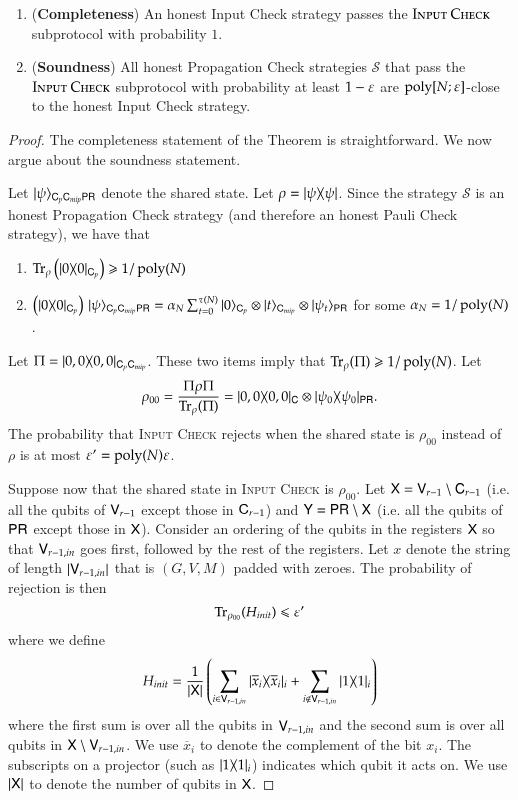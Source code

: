 \begin{lemma}	
\label{lem:input_check}
\leavevmode
\begin{enumerate}
	\item (\textbf{Completeness}) An honest Input Check strategy passes the $\textsc{Input Check}$ subprotocol with probability $1$. 
	\item (\textbf{Soundness}) All honest Propagation Check strategies $\mathcal{S}$ that pass the $\textsc{Input Check}$ subprotocol with probability at least $1 - \varepsilon$ are $\operatorname{poly}[N;\varepsilon]$-close to the honest Input Check strategy.
\end{enumerate}
\end{lemma}
\begin{proof}
The completeness statement of the Theorem is straightforward. We now argue about the soundness statement.

Let $|\psi\rangle_{{\mathsf{C}}_p {\mathsf{C}}_{mip} {\mathsf{P}} {\mathsf{R}}}$ denote the shared state. Let $\rho = |\psi\rangle\! \langle \psi|$. Since the strategy $\mathcal{S}$ is an honest Propagation Check strategy (and therefore an honest Pauli Check strategy), we have that
\begin{enumerate}
	\item $\operatorname{Tr}_\rho \left ( |0\rangle\! \langle 0|_{{\mathsf{C}}_p} \right) \geqslant 1/\operatorname{poly}(N)$
	\item $	\left( |0\rangle\! \langle 0|_{{\mathsf{C}}_p} \right) \, |\psi\rangle_{{\mathsf{C}}_p {\mathsf{C}}_{mip} {\mathsf{P}} {\mathsf{R}}} = \alpha_N \sum_{t = 0}^{\tau(N)} |0\rangle_{{\mathsf{C}}_p} \otimes |t\rangle_{{\mathsf{C}}_{mip}} \otimes |\psi_t\rangle_{{\mathsf{P}} {\mathsf{R}}}$ for some $\alpha_N = 1/\operatorname{poly}(N)$.
\end{enumerate}
Let $\Pi = |0,0\rangle\! \langle 0,0|_{{\mathsf{C}}_p {\mathsf{C}}_{mip}}$. These two items imply that $\operatorname{Tr}_\rho (\Pi) \geqslant 1/\operatorname{poly}(N)$. Let 
\[
	\rho_{00} = \frac{\Pi \rho \Pi}{\operatorname{Tr}_\rho (\Pi)} = |0,0\rangle\! \langle 0,0|_{{\mathsf{C}}} \otimes |\psi_0\rangle\! \langle \psi_0|_{{\mathsf{P}} {\mathsf{R}}}.
\]
The probability that \textsc{Input Check} rejects when the shared state is $\rho_{00}$ instead of $\rho$ is at most $\varepsilon' = \operatorname{poly}(N) \varepsilon$. 

Suppose now that the shared state in \textsc{Input Check} is $\rho_{00}$. Let ${\mathsf{X}} = {\mathsf{V}}_{r-1} \setminus {\mathsf{C}}_{r-1}$ (i.e. all the qubits of ${\mathsf{V}}_{r-1}$ except those in ${\mathsf{C}}_{r-1}$) and ${\mathsf{Y}} = {\mathsf{P}} {\mathsf{R}} \setminus {\mathsf{X}}$ (i.e. all the qubits of ${\mathsf{P}} {\mathsf{R}}$ except those in ${\mathsf{X}}$). Consider an ordering of the qubits in the registers ${\mathsf{X}}$  so that ${\mathsf{V}}_{r-1,in}$ goes first, followed by the rest of the registers. Let $x$ denote the string of length $|{\mathsf{V}}_{r-1,in}|$ that is $(G,V,M)$ padded with zeroes. The probability of rejection is then
	\begin{equation}
		\Tr_{\rho_{00}} ( H_{init} ) \leq \eps'
		\label{eq:init}
	\end{equation}
	where we define 
	\[
		H_{init} = \frac{1}{\left | {\mathsf{X}} \right|} \left ( \sum_{i \in {\mathsf{V}}_{r-1,in}} |\overline{x}_i\rangle\! \langle \overline{x}_i|_i +  \sum_{i \notin {\mathsf{V}}_{r-1,in}} |1\rangle\! \langle 1|_i \right)
	\] 
	where the first sum is over all the qubits in ${\mathsf{V}}_{r-1,in}$ and the second sum is over all qubits in ${\mathsf{X}} \setminus {\mathsf{V}}_{r-1,in}$. We use $\overline{x}_i$ to denote the complement of the bit $x_i$. The subscripts on a projector (such as $|1\rangle\! \langle 1|_i$) indicates which qubit it acts on. We use $|{\mathsf{X}}|$ to denote the number of qubits in ${\mathsf{X}}$. 
	

\end{proof}
